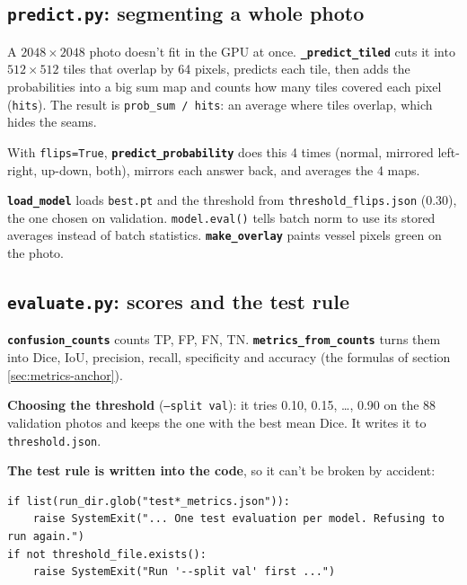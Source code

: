 \subsection{\texttt{predict.py}: segmenting a whole photo}

A $2048\times2048$ photo doesn't fit in the GPU at once. \textbf{\texttt{\_predict\_tiled}} cuts it into $512\times512$ tiles that overlap by 64 pixels, predicts each tile, then adds the probabilities into a big sum map and counts how many tiles covered each pixel (\texttt{hits}). The result is \texttt{prob\_sum / hits}: an average where tiles overlap, which hides the seams.

With \texttt{flips=True}, \textbf{\texttt{predict\_probability}} does this 4 times (normal, mirrored left-right, up-down, both), mirrors each answer back, and averages the 4 maps.

\textbf{\texttt{load\_model}} loads \texttt{best.pt} and the threshold from \texttt{threshold\_flips.json} (0.30), the one chosen on validation. \texttt{model.eval()} tells batch norm to use its stored averages instead of batch statistics. \textbf{\texttt{make\_overlay}} paints vessel pixels green on the photo.

\subsection{\texttt{evaluate.py}: scores and the test rule}

\textbf{\texttt{confusion\_counts}} counts TP, FP, FN, TN. \textbf{\texttt{metrics\_from\_counts}} turns them into Dice, IoU, precision, recall, specificity and accuracy (the formulas of section \ref{sec:metrics-anchor}).

\textbf{Choosing the threshold} (\texttt{--split val}): it tries 0.10, 0.15, \dots, 0.90 on the 88 validation photos and keeps the one with the best mean Dice. It writes it to \texttt{threshold.json}.

\textbf{The test rule is written into the code}, so it can't be broken by accident:
\begin{small}\begin{verbatim}
if list(run_dir.glob("test*_metrics.json")):
    raise SystemExit("... One test evaluation per model. Refusing to run again.")
if not threshold_file.exists():
    raise SystemExit("Run '--split val' first ...")
\end{verbatim}
\end{small}

